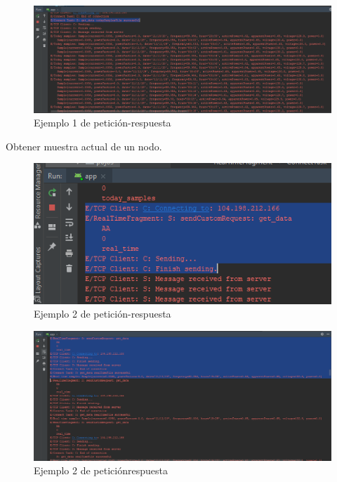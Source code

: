 \begin{figure}[H]
	\centering
	\includegraphics[scale=.4]{Capitulo5/images/connect2.png}
	\caption{Ejemplo 1 de petición-respuesta}	\label{fig:connect2}
\end{figure} 

Obtener muestra actual de un nodo.
\begin{figure}[H]
	\centering
	\includegraphics[scale=.4]{Capitulo5/images/connect3.png}
	\caption{Ejemplo 2 de petición-respuesta}	\label{fig:connect3}
\end{figure} 

\begin{figure}[H]
	\centering
	\includegraphics[scale=.4]{Capitulo5/images/connect4.png}
	\caption{Ejemplo 2 de petición\-respuesta}	\label{fig:connect4}
\end{figure} 

